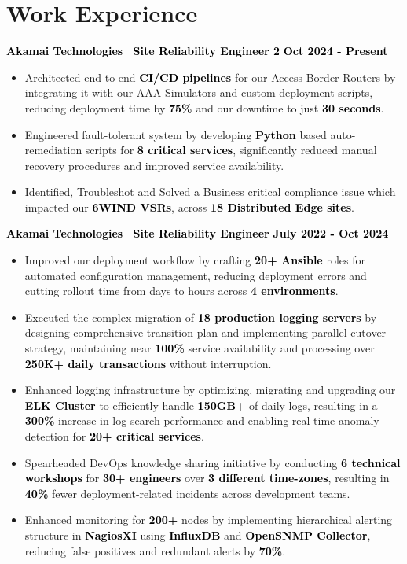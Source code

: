 \documentclass[a4paper,10pt]{article}
\newcommand{\bb}[1]{\textcolor{black}{\textbf{#1}}}
\begin{document}
\section{Work Experience}
\bb{ Akamai Technologies \textbar\ Site Reliability Engineer 2 } \hfill \bb{Oct 2024 - Present}
\smallskip
\begin{itemize}[nosep, leftmargin=2em, itemsep=3pt]
    \item Architected end-to-end \bb{CI/CD pipelines} for our Access Border Routers by integrating it with our AAA Simulators and custom deployment scripts, reducing deployment time by \bb{75\%} and our downtime to just \bb{30 seconds}.
    \item Engineered fault-tolerant system by developing \bb{Python} based auto-remediation scripts for \bb{8 critical services}, significantly reduced manual recovery procedures and improved service availability.
    \item Identified, Troubleshot and Solved a Business critical compliance issue which impacted our \bb{6WIND VSRs}, across \bb{18 Distributed Edge sites}.
\end{itemize}
\medskip
%
\bb{ Akamai Technologies \textbar\ Site Reliability Engineer } \hfill \bb{July 2022 - Oct 2024}
\smallskip
\begin{itemize}[nosep, leftmargin=2em, itemsep=3pt]
    \item Improved our deployment workflow by crafting \bb{20+ Ansible} roles for automated configuration management, reducing deployment errors and cutting rollout time from days to hours across \bb{4 environments}.
    \item Executed the complex migration of \bb{18 production logging servers} by designing comprehensive transition plan and implementing parallel cutover strategy, maintaining near \bb{100\%} service availability and processing over \bb{250K+ daily transactions} without interruption.
    \item Enhanced logging infrastructure by optimizing, migrating and upgrading our \bb{ELK Cluster} to efficiently handle \bb{150GB+} of daily logs, resulting in a \bb{300\%} increase in log search performance and enabling real-time anomaly detection for \bb{20+ critical services}.
    \item Spearheaded DevOps knowledge sharing initiative by conducting \bb{6 technical workshops} for \bb{30+ engineers} over \bb{3 different time-zones}, resulting in \bb{40\%} fewer deployment-related incidents across development teams.
    \item Enhanced monitoring for \bb{200+} nodes by implementing hierarchical alerting structure in \bb{NagiosXI} using \bb{InfluxDB} and \bb{OpenSNMP Collector}, reducing false positives and redundant alerts by \bb{70\%}.
\end{itemize}
\vspace{-1em}
%
%
\end{document}
